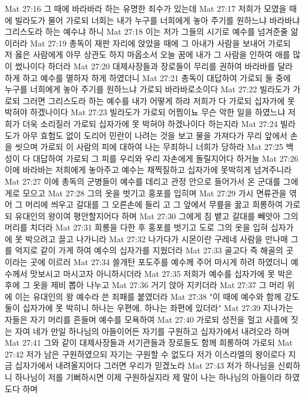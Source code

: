 Mat 27:16  그 때에 바라바라 하는 유명한 죄수가 있는데
Mat 27:17  저희가 모였을 때에 빌라도가 물어 가로되 너희는 내가 누구를 너희에게 놓아 주기를 원하느냐 바라바냐 그리스도라 하는 예수냐 하니
Mat 27:18  이는 저가 그들의 시기로 예수를 넘겨준줄 앎이러라
Mat 27:19  총독이 재판 자리에 앉았을 때에 그 아내가 사람을 보내어 가로되 저 옳은 사람에게 아무 상관도 하지 마옵소서 오늘 꿈에 내가 그 사람을 인하여 애를 많이 썼나이다 하더라
Mat 27:20  대제사장들과 장로들이 무리를 권하여 바라바를 달라 하게 하고 예수를 멸하자 하게 하였더니
Mat 27:21  총독이 대답하여 가로되 둘 중에 누구를 너희에게 놓아 주기를 원하느냐 가로되 바라바로소이다
Mat 27:22  빌라도가 가로되 그러면 그리스도라 하는 예수를 내가 어떻게 하랴 저희가 다 가로되 십자가에 못 박혀야 하겠나이다
Mat 27:23  빌라도가 가로되 어찜이뇨 무슨 악한 일을 하였느냐 저희가 더욱 소리질러 가로되 십자가에 못 박혀야 하겠나이다 하는지라
Mat 27:24  빌라도가 아무 효험도 없이 도리어 민란이 나려는 것을 보고 물을 가져다가 무리 앞에서 손을 씻으며 가로되 이 사람의 피에 대하여 나는 무죄하니 너희가 당하라
Mat 27:25  백성이 다 대답하여 가로되 그 피를 우리와 우리 자손에게 돌릴지어다 하거늘
Mat 27:26  이에 바라바는 저희에게 놓아주고 예수는 채찍질하고 십자가에 못박히게 넘겨주니라
Mat 27:27  이에 총독의 군병들이 예수를 데리고 관정 안으로 들어가서 온 군대를 그에게로 모으고
Mat 27:28  그의 옷을 벗기고 홍포를 입히며
Mat 27:29  가시 면류관을 엮어 그 머리에 씌우고 갈대를 그 오른손에 들리 고 그 앞에서 무릎을 꿇고 희롱하여 가로되 유대인의 왕이여 평안할지어다 하며
Mat 27:30  그에게 침 뱉고 갈대를 빼앗아 그의 머리를 치더라
Mat 27:31  희롱을 다한 후 홍포를 벗기고 도로 그의 옷을 입혀 십자가에 못 박으려고 끌고 나가니라
Mat 27:32  나가다가 시몬이란 구레네 사람을 만나매 그를 억지로 같이 가게 하여 예수의 십자가를 지웠더라
Mat 27:33  골고다 즉 해골의 곳이라는 곳에 이르러
Mat 27:34  쓸개탄 포도주를 예수께 주어 마시게 하려 하였더니 예수께서 맛보시고 마시고자 아니하시더라
Mat 27:35  저희가 예수를 십자가에 못 박은 후에 그 옷을 제비 뽑아 나누고
Mat 27:36  거기 앉아 지키더라
Mat 27:37  그 머리 위에 이는 유대인의 왕 예수라 쓴 죄패를 붙였더라
Mat 27:38  "이 때에 예수와 함께 강도 둘이 십자가에 못 박히니 하나는 우편에, 하나는 좌편에 있더라"
Mat 27:39  지나가는 자들은 자기 머리를 흔들며 예수를 모욕하여
Mat 27:40  가로되 성전을 헐고 사흘에 짓는 자여 네가 만일 하나님의 아들이어든 자기를 구원하고 십자가에서 내려오라 하며
Mat 27:41  그와 같이 대제사장들과 서기관들과 장로들도 함께 희롱하여 가로되
Mat 27:42  저가 남은 구원하였으되 자기는 구원할 수 없도다 저가 이스라엘의 왕이로다 지금 십자가에서 내려올지어다 그러면 우리가 믿겠노라
Mat 27:43  저가 하나님을 신뢰하니 하나님이 저를 기뻐하시면 이제 구원하실지라 제 말이 나는 하나님의 아들이라 하였도다 하며
